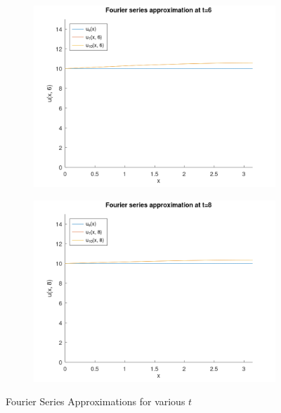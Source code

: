 \begin{solution}
\begin{figure}[h]
        \centering
        \begin{subfigure}[b]{0.475\textwidth}
            \centering
            \includegraphics[width=\textwidth]{problem1e_fourier_series_solution_t_6.png}
            \label{fig:problem1e_t6}
        \end{subfigure}
        \hfill
        \begin{subfigure}[b]{0.475\textwidth}
            \centering
            \includegraphics[width=\textwidth]{problem1e_fourier_series_solution_t_8.png}
            \label{fig:problem1e_t8}
        \end{subfigure}
        \caption[]{Fourier Series Approximations for various $t$}
    \end{figure}
\end{solution}